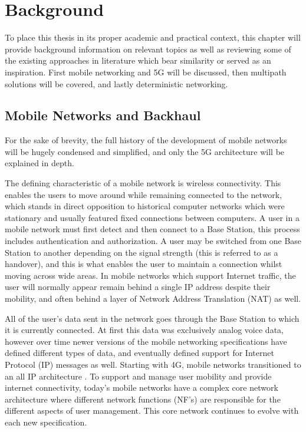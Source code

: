 
\cleardoublepage
\chapter{Background}
\label{cha:background}

To place this thesis in its proper academic and practical context, this chapter will provide background information on relevant topics as well as reviewing some of the existing approaches in literature which bear similarity or served as an inspiration. First mobile networking and 5G will be discussed, then multipath solutions will be covered, and lastly deterministic networking.

\section{Mobile Networks and Backhaul}

For the sake of brevity, the full history of the development of mobile networks will be hugely condensed and simplified, and only the 5G architecture will be explained in depth.

The defining characteristic of a mobile network is wireless connectivity. This enables the users to move around while remaining connected to the network, which stands in direct opposition to historical computer networks which were stationary and usually featured fixed connections between computers. A user in a mobile network must first detect and then connect to a Base Station, this process includes authentication and authorization. A user may be switched from one Base Station to another depending on the signal strength (this is referred to as a handover), and this is what enables the user to maintain a connection whilst moving across wide areas. In mobile networks which support Internet traffic, the user will normally appear remain behind a single IP address despite their mobility, and often behind a layer of Network Address Translation (NAT) as well.

All of the user's data sent in the network goes through the Base Station to which it is currently connected. At first this data was exclusively analog voice data, however over time newer versions of the mobile networking specifications have defined different types of data, and eventually defined support for Internet Protocol (IP) messages as well. Starting with 4G, mobile networks transitioned to an all IP architecture \cite{3gpp.36.300}. To support and manage user mobility and provide internet connectivity, today's mobile networks have a complex core network architecture where different network functions (NF's) are responsible for the different aspects of user management. This core network continues to evolve with each new specification.

